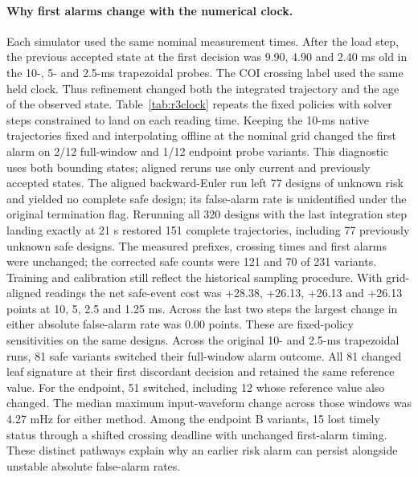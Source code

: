 \documentclass[10pt]{article}
\begin{document}
\paragraph{Why first alarms change with the numerical clock.}
Each simulator used the same nominal measurement times. After the load step, the previous accepted state at the first decision was 9.90, 4.90 and 2.40 ms old in the 10-, 5- and 2.5-ms trapezoidal probes. The COI crossing label used the same held clock. Thus refinement changed both the integrated trajectory and the age of the observed state. Table~\ref{tab:r3clock} repeats the fixed policies with solver steps constrained to land on each reading time. Keeping the 10-ms native trajectories fixed and interpolating offline at the nominal grid changed the first alarm on 2/12 full-window and 1/12 endpoint probe variants. This diagnostic uses both bounding states; aligned reruns use only current and previously accepted states. The aligned backward-Euler run left 77 designs of unknown risk and yielded no complete safe design; its false-alarm rate is unidentified under the original termination flag. Rerunning all 320 designs with the last integration step landing exactly at 21 s restored 151 complete trajectories, including 77 previously unknown safe designs. The measured prefixes, crossing times and first alarms were unchanged; the corrected safe counts were 121 and 70 of 231 variants. Training and calibration still reflect the historical sampling procedure.
With grid-aligned readings the net safe-event cost was +28.38, +26.13, +26.13 and +26.13 points at 10, 5, 2.5 and 1.25 ms. Across the last two steps the largest change in either absolute false-alarm rate was 0.00 points. These are fixed-policy sensitivities on the same designs. Across the original 10- and 2.5-ms trapezoidal runs, 81 safe variants switched their full-window alarm outcome. All 81 changed leaf signature at their first discordant decision and retained the same reference value. For the endpoint, 51 switched, including 12 whose reference value also changed. The median maximum input-waveform change across those windows was 4.27 mHz for either method. Among the endpoint B variants, 15 lost timely status through a shifted crossing deadline with unchanged first-alarm timing. These distinct pathways explain why an earlier risk alarm can persist alongside unstable absolute false-alarm rates.
\end{document}
